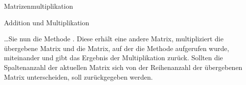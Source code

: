 \documentclass{../tuda-exercise}
\begin{document}
\begin{task}[credit=\stars{3}{3}]{Matrizenmultiplikation}
\begin{subtask*}{Addition und Multiplikation}
      \br

      \dots Sie nun die Methode . Diese erhält
      eine andere Matrix, multipliziert die übergebene Matrix und die Matrix, auf der die Methode
      aufgerufen wurde, miteinander und gibt das Ergebnis der Multiplikation zurück. Sollten die
      Spaltenanzahl der aktuellen Matrix sich von der Reihenanzahl der übergebenen Matrix
      unterscheiden, soll  zurückgegeben werden.

      \clearpagesolution

      \begin{solution}
        
      \end{solution}
    \end{subtask*}
  \end{task}
\end{document}
